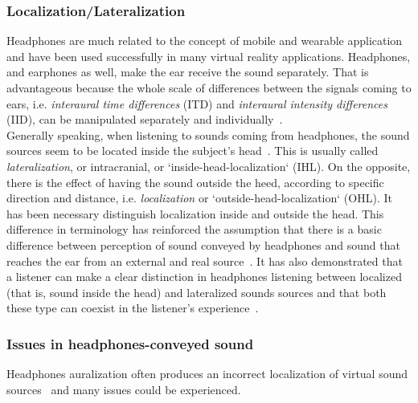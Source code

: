 \documentclass[journal]{IEEEtran}
\begin{document}
\subsubsection{Localization/Lateralization}
Headphones are much related to the concept of mobile and wearable application and have been used successfully in many virtual reality applications. Headphones, and earphones as well, make the ear receive the sound separately. That is advantageous because the whole scale of differences between the signals coming to ears, i.e. \emph{interaural time differences} (ITD) and \emph{interaural intensity differences} (IID), can be manipulated separately and individually~\cite{}.\\
Generally speaking, when listening to sounds coming from headphones, the sound sources seem to be located inside the subject's head~\cite{}. This is usually called \emph{lateralization}, or intracranial, or `inside-head-localization` (IHL). On the opposite, there is the effect of having the sound outside the heed, according to specific direction and distance, i.e. \emph{localization} or `outside-head-localization` (OHL).
It has been necessary distinguish localization inside and outside the head. This difference in terminology has reinforced the assumption that there is a basic difference between perception of sound conveyed by headphones and sound that reaches the ear from an external and real source~\cite{}. It has also demonstrated that a listener can make a clear distinction in headphones listening between localized (that is, sound inside the head) and lateralized sounds sources and that both these type can coexist in the listener's experience~\cite{}.  

\subsubsection{Issues in headphones-conveyed sound}
Headphones auralization often produces an incorrect localization of virtual sound sources~\cite{} and many issues could be experienced.\\
\end{document}
